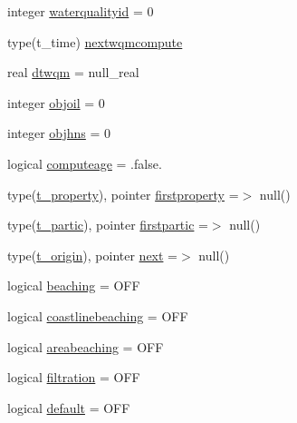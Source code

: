 \begin{DoxyCompactItemize}
\item 
integer \mbox{\hyperlink{structmodulelagrangianglobal_1_1t__origin_a91dbc8a2b4262449bb0a1da8d4f82adf}{waterqualityid}} = 0
\item 
type(t\+\_\+time) \mbox{\hyperlink{structmodulelagrangianglobal_1_1t__origin_a8d02511581ef9b51c4f3a4e1776f3abb}{nextwqmcompute}}
\item 
real \mbox{\hyperlink{structmodulelagrangianglobal_1_1t__origin_ae0660e94ff07da1f2ca9d3d70a8bc0c1}{dtwqm}} = null\+\_\+real
\item 
integer \mbox{\hyperlink{structmodulelagrangianglobal_1_1t__origin_a0fe673e4dc0ff4be148708d53c161f70}{objoil}} = 0
\item 
integer \mbox{\hyperlink{structmodulelagrangianglobal_1_1t__origin_a2fd0a643187e3836f38c8789fcc4ab25}{objhns}} = 0
\item 
logical \mbox{\hyperlink{structmodulelagrangianglobal_1_1t__origin_a8bb9bf3229e13f1d3411ab2d09e51f1a}{computeage}} = .false.
\item 
type(\mbox{\hyperlink{structmodulelagrangianglobal_1_1t__property}{t\+\_\+property}}), pointer \mbox{\hyperlink{structmodulelagrangianglobal_1_1t__origin_a33047ef750077735cd0ae8bf575f9b50}{firstproperty}} =$>$ null()
\item 
type(\mbox{\hyperlink{structmodulelagrangianglobal_1_1t__partic}{t\+\_\+partic}}), pointer \mbox{\hyperlink{structmodulelagrangianglobal_1_1t__origin_a76645ba16043b537d49d0cc08e6f4d35}{firstpartic}} =$>$ null()
\item 
type(\mbox{\hyperlink{structmodulelagrangianglobal_1_1t__origin}{t\+\_\+origin}}), pointer \mbox{\hyperlink{structmodulelagrangianglobal_1_1t__origin_af61a49949f60f6d90d15c44a8d654400}{next}} =$>$ null()
\item 
logical \mbox{\hyperlink{structmodulelagrangianglobal_1_1t__origin_a2f8685c0f386e94eccbc8b45c21a8d30}{beaching}} = O\+FF
\item 
logical \mbox{\hyperlink{structmodulelagrangianglobal_1_1t__origin_a7fbec6751be0f887fa02bf298e4019ed}{coastlinebeaching}} = O\+FF
\item 
logical \mbox{\hyperlink{structmodulelagrangianglobal_1_1t__origin_a194d276475e787e173b63910e56fc619}{areabeaching}} = O\+FF
\item 
logical \mbox{\hyperlink{structmodulelagrangianglobal_1_1t__origin_af943c197b67924acc85a67ca46578cbb}{filtration}} = O\+FF
\item 
logical \mbox{\hyperlink{structmodulelagrangianglobal_1_1t__origin_a835203b0e767ba132d040efa45a3af0d}{default}} = O\+FF

\end{DoxyCompactItemize}
